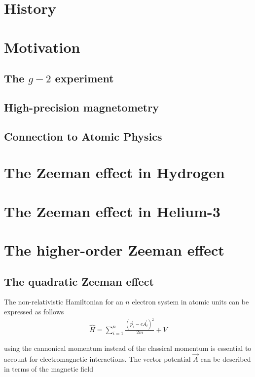     \section{History}\label{sec:history}
    \section{Motivation}\label{sec:motivation}
        \subsection{The $g-2$ experiment}\label{sec:g-2}
        \subsection{High-precision magnetometry}\label{sec:High-Precision-magnetometry}
        \subsection{Connection to Atomic Physics}\label{sec:Connection_To_AMO}
    \section{The Zeeman effect in Hydrogen}\label{sec:Ordinary_Zeeman}
    \section{The Zeeman effect in Helium-3}\label{sec:Ordinary_Zeeman_He3}
    \section{The higher-order Zeeman effect}\label{sec:Higher_Zeeman}
        \subsection{The quadratic Zeeman effect}\label{sec:quadratic_zeeman}
            The non-relativistic Hamiltonian for an $n$ electron system in atomic units can be expressed as follows
            \begin{align}
                \hat{H} = \sum_{i = 1}^n \frac{\left(\vec{p}_i - e\vec{A}_i \right)^2}{2m} + V
            \end{align}

            \noindent using the cannonical momentum instead of the classical momentum is essential to account for electromagnetic interactions. The vector potential $\vec{A}$ can be described in terms of the magnetic field

